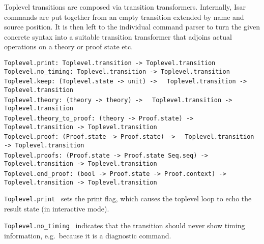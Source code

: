 \begin{isabellebody}
\begin{isamarkuptext}
  Toplevel transitions are composed via transition transformers.
  Internally, Isar commands are put together from an empty transition
  extended by name and source position.  It is then left to the
  individual command parser to turn the given concrete syntax into a
  suitable transition transformer that adjoins actual operations on a
  theory or proof state etc.%
\end{isamarkuptext}%
\isamarkuptrue%
%
\isadelimmlref
%
\endisadelimmlref
%
\isatagmlref
%
\begin{isamarkuptext}%
\begin{mldecls}
  \verb|Toplevel.print: Toplevel.transition -> Toplevel.transition| \\
  \verb|Toplevel.no_timing: Toplevel.transition -> Toplevel.transition| \\
  \verb|Toplevel.keep: (Toplevel.state -> unit) ->|\isasep\isanewline%
\verb|  Toplevel.transition -> Toplevel.transition| \\
  \verb|Toplevel.theory: (theory -> theory) ->|\isasep\isanewline%
\verb|  Toplevel.transition -> Toplevel.transition| \\
  \verb|Toplevel.theory_to_proof: (theory -> Proof.state) ->|\isasep\isanewline%
\verb|  Toplevel.transition -> Toplevel.transition| \\
  \verb|Toplevel.proof: (Proof.state -> Proof.state) ->|\isasep\isanewline%
\verb|  Toplevel.transition -> Toplevel.transition| \\
  \verb|Toplevel.proofs: (Proof.state -> Proof.state Seq.seq) ->|\isasep\isanewline%
\verb|  Toplevel.transition -> Toplevel.transition| \\
  \verb|Toplevel.end_proof: (bool -> Proof.state -> Proof.context) ->|\isasep\isanewline%
\verb|  Toplevel.transition -> Toplevel.transition| \\
  \end{mldecls}

  \begin{description}

  \item \verb|Toplevel.print|~ sets the print flag, which
  causes the toplevel loop to echo the result state (in interactive
  mode).

  \item \verb|Toplevel.no_timing|~ indicates that the
  transition should never show timing information, e.g.\ because it is
  a diagnostic command.


\end{description}
\end{isamarkuptext}
\end{isabellebody}
